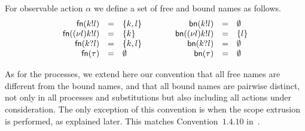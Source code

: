 \begin{definition}\label{def:free_and_bound_name_of_actions}
For observable action $\alpha$ we define a set of free and bound names as follows.
\[
\begin{array}{rcl}
\mathsf{fn}(k!l) & = & \{k, l\}\\
\mathsf{fn}((\nu l)k!l) & = & \{ k\}\\
\mathsf{fn}(k?l) & = & \{k, l\} \\
\mathsf{fn}(\tau) & = & \emptyset
\end{array}
\qquad\quad
\begin{array}{rcl}
\mathsf{bn}(k!l) & = & \emptyset\\
\mathsf{bn}((\nu l)k!l) & = & \{ l\}\\
\mathsf{bn}(k?l) & = & \emptyset \\
\mathsf{bn}(\tau) & = & \emptyset\\
\end{array}
\]
\end{definition}
%

As for the processes, we extend here our convention that all free names are different from the bound names, and that all bound names are pairwise distinct, 
not only in all processes and substitutions but also including all actions under consideration. The only exception of this convention is when the scope extrusion is performed, as explained later. This matches Convention~$1.4.10$ in~\cite{pi_calculus}.



